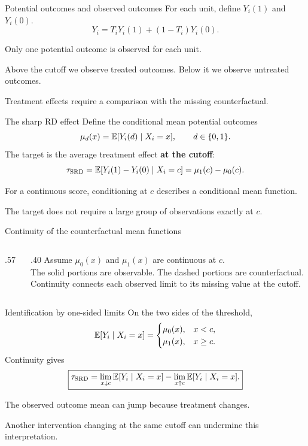 \begin{frame}{Potential outcomes and observed outcomes}
For each unit, define $Y_i(1)$ and $Y_i(0)$.
\[
Y_i=T_iY_i(1)+(1-T_i)Y_i(0).
\]
\begin{items}
\item Only one potential outcome is observed for each unit.
\item Above the cutoff we observe treated outcomes. Below it we observe untreated outcomes.
\item Treatment effects require a comparison with the missing counterfactual.
\end{items}
\end{frame}

\begin{frame}{The sharp RD effect}
Define the conditional mean potential outcomes
\[
\mu_d(x)=\mathbb{E}[Y_i(d)\mid X_i=x],\qquad d\in\{0,1\}.
\]
The target is the average treatment effect \textbf{at the cutoff}:
\[
\tau_{\mathrm{SRD}}=\mathbb{E}[Y_i(1)-Y_i(0)\mid X_i=c]
=\mu_1(c)-\mu_0(c).
\]
\begin{items}
\item For a continuous score, conditioning at $c$ describes a conditional mean function.
\item The target does not require a large group of observations exactly at $c$.
\end{items}
\end{frame}

\begin{frame}{Continuity of the counterfactual mean functions}
\begin{columns}
\begin{column}{.57\textwidth}\end{column}
\begin{column}{.40\textwidth}
Assume $\mu_0(x)$ and $\mu_1(x)$ are continuous at $c$.\\[.8em]
The solid portions are observable. The dashed portions are counterfactual.\\[.8em]
Continuity connects each observed limit to its missing value at the cutoff.
\end{column}
\end{columns}
\end{frame}

\begin{frame}{Identification by one-sided limits}
On the two sides of the threshold,
\[
\mathbb{E}[Y_i\mid X_i=x]=
\begin{cases}\mu_0(x),&x<c,\\\mu_1(x),&x\geq c.\end{cases}
\]
Continuity gives
\[
\boxed{\tau_{\mathrm{SRD}}=
\lim_{x\downarrow c}\mathbb{E}[Y_i\mid X_i=x]
-\lim_{x\uparrow c}\mathbb{E}[Y_i\mid X_i=x].}
\]
\begin{items}
\item The observed outcome mean can jump because treatment changes.
\item Another intervention changing at the same cutoff can undermine this interpretation.
\end{items}
\end{frame}

